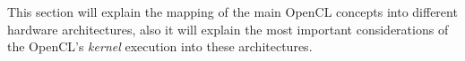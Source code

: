 \par{This section will explain the mapping of the main OpenCL concepts into different hardware architectures, 
    also it will explain the most important considerations of the OpenCL's \emph{kernel} execution into these architectures}.
